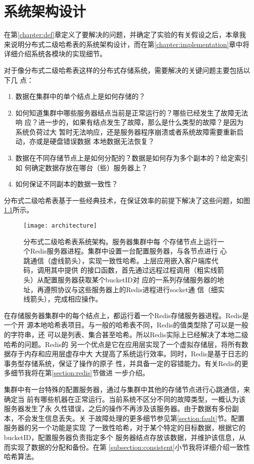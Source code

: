 \chapter{系统架构设计}\label{chapter:architecture}
在第\ref{chapter:def}章定义了要解决的问题，并确定了实验的有关假设之后，本章我
来说明分布式二级哈希表的系统架构设计，而在第\ref{chapter:implementation}章中将
详细介绍系统各模块的实现细节。

对于像分布式二级哈希表这样的分布式存储系统，需要解决的关键问题主要包括以下几
点：
\begin{enumerate}
  \item 数据在集群中的单个结点上是如何存储的？
  \item 如何知道集群中哪些服务器结点当前是正常运行的？哪些已经发生了故障无法响
  应？进一步的，如果有结点发生了故障，那么是什么类型的故障？是因为系统负荷过大
  暂时无法响应，还是服务器程序崩溃或者系统故障需要重新启动，亦或是硬盘错误数据
  本地数据无法恢复？
  \item 数据在不同存储节点上是如何分配的？数据是如何存为多个副本的？给定索引如
  何确定数据存放在哪台（些）服务器上？
  \item 如何保证不同副本的数据一致性？
\end{enumerate}
分布式二级哈希表基于一些经典技术，在保证效率的前提下解决了这些问题，如图
\ref{figure:architecture}所示。
\begin{figure}[htb]
  \centering
  \texttt{[image: architecture]}
  \caption[分布式二级哈希表系统架构]{分布式二级哈希表系统架构。服务器集群中每
  个存储节点上运行一个Redis服务器进程。集群中设置一台配置服务器，与各节点进行
  心跳通信（虚线箭头），实现一致性哈希。上层应用嵌入客户端库代码，调用其中提供
  的接口函数，首先通过远程过程调用（粗实线箭头）从配置服务器获取某个bucketID对
  应的一系列存储服务器的地址，再遵照协议与这些服务器上的Redis进程进行socket通
  信（细实线箭头），完成相应操作。}
  \label{figure:architecture}
\end{figure}

在存储服务器集群中的每个结点上，都运行着一个Redis存储服务器进程。Redis是一个开
源本地哈希表项目。与一般的哈希表不同，Redis的值类型除了可以是一般的字符串，还
可以是列表、集合甚至哈希。所以Redis实际上已经解决了本地二级哈希的问题。Redis的
另一个优点是它在应用层实现了一个虚拟存储层，将所有数据存于内存和应用层虚存中大
大提高了系统运行效率。同时，Redis是基于日志的事务型存储系统，保证了操作的原子
性，并具备一定的容错能力。有关Redis的更多细节我将在第\ref{section:redis}节做进
一步介绍。

集群中有一台特殊的配置服务器，通过与集群中其他的存储节点进行心跳通信，来确定当
前有哪些机器在正常运行。当前系统不区分不同的故障类型，一概认为该服务器发生了永
久性错误，之后的操作不再涉及该服务器。由于数据有多份副本，不会发生信息丢失。关
于故障处理的更多细节参见第\ref{section:fault}节。配置服务器的另一个功能是实现
了一致性哈希，对于某个特定的目标数据，根据它的bucketID，配置服务器负责指定多个
服务器结点存放该数据，并维护该信息，从而实现了数据的分配和备份。在第
\ref{subsection:consistent}小节我将详细介绍一致性哈希算法。

